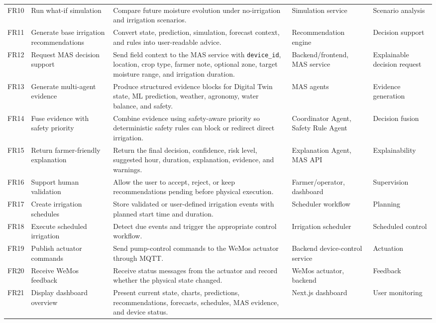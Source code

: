 \begin{footnotesize}
\begin{longtable}{@{}p{}p{}p{}p{}p{}@{}}
FR10 & Run what-if simulation & Compare future moisture evolution under no-irrigation and irrigation scenarios. & Simulation service & Scenario analysis \\
FR11 & Generate base irrigation recommendations & Convert state, prediction, simulation, forecast context, and rules into user-readable advice. & Recommendation engine & Decision support \\
FR12 & Request MAS decision support & Send field context to the MAS service with \texttt{device\_id}, location, crop type, farmer note, optional zone, target moisture range, and irrigation duration. & Backend/frontend, MAS service & Explainable decision request \\
FR13 & Generate multi-agent evidence & Produce structured evidence blocks for Digital Twin state, ML prediction, weather, agronomy, water balance, and safety. & MAS agents & Evidence generation \\
FR14 & Fuse evidence with safety priority & Combine evidence using safety-aware priority so deterministic safety rules can block or redirect direct irrigation. & Coordinator Agent, Safety Rule Agent & Decision fusion \\
FR15 & Return farmer-friendly explanation & Return the final decision, confidence, risk level, suggested hour, duration, explanation, evidence, and warnings. & Explanation Agent, MAS API & Explainability \\
FR16 & Support human validation & Allow the user to accept, reject, or keep recommendations pending before physical execution. & Farmer/operator, dashboard & Supervision \\
FR17 & Create irrigation schedules & Store validated or user-defined irrigation events with planned start time and duration. & Scheduler workflow & Planning \\
FR18 & Execute scheduled irrigation & Detect due events and trigger the appropriate control workflow. & Irrigation scheduler & Scheduled control \\
FR19 & Publish actuator commands & Send pump-control commands to the WeMos actuator through MQTT. & Backend device-control service & Actuation \\
FR20 & Receive WeMos feedback & Receive status messages from the actuator and record whether the physical state changed. & WeMos actuator, backend & Feedback \\
FR21 & Display dashboard overview & Present current state, charts, predictions, recommendations, forecasts, schedules, MAS evidence, and device status. & Next.js dashboard & User monitoring \\

\end{longtable}
\end{footnotesize}
